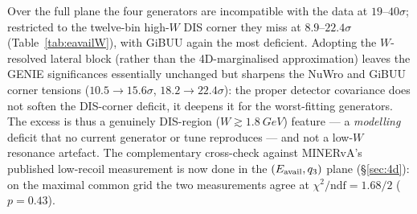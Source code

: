 Over the full plane the four generators are incompatible with the data at
$19$--$40\sigma$; restricted to the twelve-bin high-$W$ DIS corner they miss
at $8.9$--$22.4\sigma$ (Table~\ref{tab:eavailW}), with GiBUU again the most
deficient. Adopting the $W$-resolved lateral block (rather than the
4D-marginalised approximation) leaves the GENIE significances essentially
unchanged but sharpens the NuWro and GiBUU corner tensions
($10.5\to15.6\sigma$, $18.2\to22.4\sigma$): the proper detector covariance
does not soften the DIS-corner deficit, it deepens it for the worst-fitting
generators. The excess is thus a genuinely DIS-region
($W\gtrsim\SI{1.8}{GeV}$) feature --- a \emph{modelling} deficit that no
current generator or tune reproduces --- and not a low-$W$ resonance
artefact. The complementary cross-check against MINERvA's published
low-recoil measurement is now done in the $(E_{\mathrm{avail}},q_{3})$ plane
(\S\ref{sec:4d}): on the maximal common grid the two measurements agree at
$\chi^{2}/\mathrm{ndf}=1.68/2$ ($p=0.43$).
